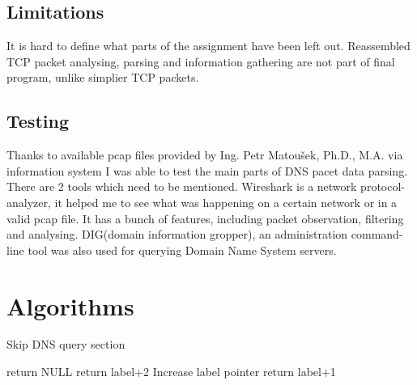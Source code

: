 \documentclass[11pt,a4paper]{article}
\begin{document}
\subsection{Limitations}
\label{LIMITATIONS}
It is hard to define what parts of the assignment have been left out. Reassembled TCP packet analysing, parsing and information gathering are not part of final program, unlike simplier TCP packets.

\subsection{Testing}
\label{TESTING}
Thanks to available pcap files provided by Ing. Petr Matoušek, Ph.D., M.A. via information system I was able to test the main parts of DNS pacet data parsing. There are 2 tools which need to be mentioned. Wireshark is a network protocol-analyzer, it helped me to see what was happening on a certain network or in a valid pcap file. It has a bunch of features, including packet observation, filtering and analysing. DIG(domain information gropper), an administration command-line tool was also used for querying Domain Name System servers.


\section{Algorithms}
\label{ALGORITHMS}

\label{skipDNSQuery}
\begin{algorithm}
    \caption{Skip DNS query section}
    \begin{algorithmic}

            \State return NULL
        \EndIf
            \State return label+2
        \EndIf
            \State Increase label pointer
        \EndWhile
        \State return label+1
    \EndProcedure
    \end{algorithmic}
\end{algorithm}
\end{document}
